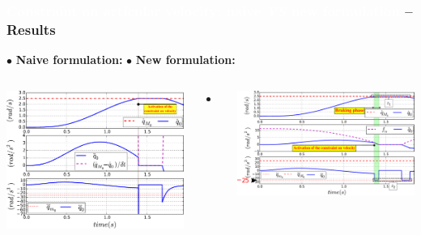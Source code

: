\begin{frame}[noframenumbering]
\frametitle{{\textcolor{white}{Constraint on articular velocity: naive \textit{VS} new formulation} -- Results}}
$\bullet$ \textbf{Naive formulation:} \hspace{27mm} $\bullet$ {\color{blue}\textbf{New formulation:}}
\begin{columns}
\vspace{2mm}

{\includegraphics[width=0.91\columnwidth]{figures/0_Vel_constr_classic}} 


\begin{itemize}
\addtolength{\itemindent}{-1mm}
\item[\hookrightarrow] 
\end{itemize}



\vspace{-10mm}
\vspace{2mm}

{\includegraphics[width=1.01\columnwidth]{figures/1_Vel_constr_jerk_comp_}} 



\end{columns}
\end{frame}
